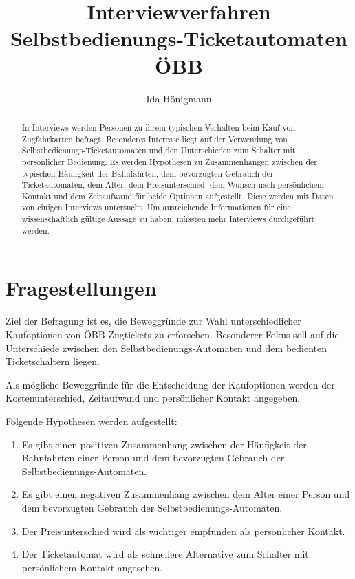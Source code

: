 \documentclass[]{article}
\title{Interviewverfahren\\ Selbstbedienungs-Ticketautomaten ÖBB}
\author{Ida Hönigmann}
\begin{document}
\maketitle

\begin{abstract}
	In Interviews werden Personen zu ihrem typischen Verhalten beim Kauf von Zugfahrkarten befragt. Besonderes Interesse liegt auf der Verwendung von Selbstbedienungs-Ticketautomaten und den Unterschieden zum Schalter mit persönlicher Bedienung. Es werden Hypothesen zu Zusammenhängen zwischen der typischen Häufigkeit der Bahnfahrten, dem bevorzugten Gebrauch der Ticketautomaten, dem Alter, dem Preisunterschied, dem Wunsch nach persönlichem Kontakt und dem Zeitaufwand für beide Optionen aufgestellt. Diese werden mit Daten von einigen Interviews untersucht. Um ausreichende Informationen für eine wissenschaftlich gültige Aussage zu haben, müssten mehr Interviews durchgeführt werden.
\end{abstract}

\section{Fragestellungen}
\label{sec:fragestellungen}

Ziel der Befragung ist es, die Beweggründe zur Wahl unterschiedlicher Kaufoptionen von ÖBB Zugtickets zu erforschen. Besonderer Fokus soll auf die Unterschiede zwischen den Selbstbedienungs-Automaten und dem bedienten Ticketschaltern liegen.

Als mögliche Beweggründe für die Entscheidung der Kaufoptionen werden der Kostenunterschied, Zeitaufwand und persönlicher Kontakt angegeben.

Folgende Hypothesen werden aufgestellt:

\begin{enumerate}[label={H\arabic*: }]
	\item Es gibt einen positiven Zusammenhang zwischen der Häufigkeit der Bahnfahrten einer Person und dem bevorzugten Gebrauch der Selbstbedienungs-Automaten.
	\item Es gibt einen negativen Zusammenhang zwischen dem Alter einer Person und dem bevorzugten Gebrauch der Selbstbedienungs-Automaten.
	\item Der Preisunterschied wird als wichtiger empfunden als persönlicher Kontakt.
	\item Der Ticketautomat wird als schnellere Alternative zum Schalter mit persönlichem Kontakt angesehen.
\end{enumerate}
\end{document}
